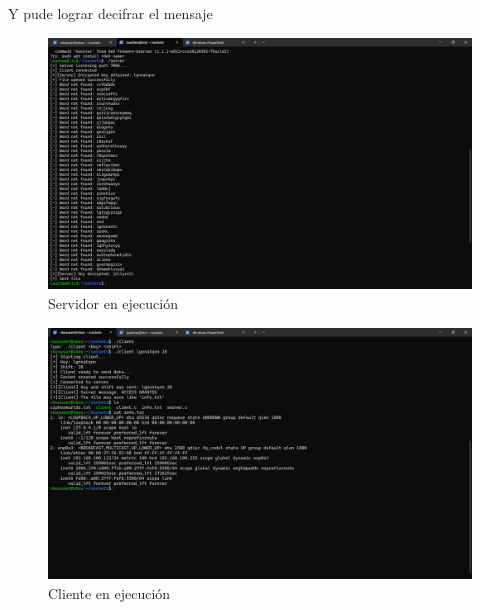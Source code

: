 \documentclass{article}
\begin{document}
\begin{enumerate}
    Y pude lograr decifrar el mensaje
    \begin{figure}
        \includegraphics[width=\linewidth]{./images/server.png}
        \caption{Servidor en ejecución}
    \end{figure}
    \begin{figure}
        \includegraphics[width=\linewidth]{./images/client.png}
        \caption{Cliente en ejecución}
    \end{figure}
\end{enumerate}
\end{document}
